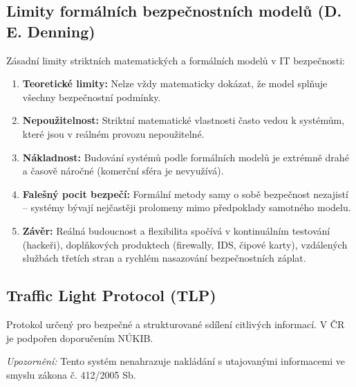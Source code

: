 \documentclass[10pt,a4paper]{article}
\begin{document}
	\subsection{Limity formálních bezpečnostních modelů (D. E. Denning)}
	Zásadní limity striktních matematických a formálních modelů v IT bezpečnosti:
	\begin{enumerate}
		\item \textbf{Teoretické limity:} Nelze vždy matematicky dokázat, že model splňuje všechny bezpečnostní podmínky.
		\item \textbf{Nepoužitelnost:} Striktní matematické vlastnosti často vedou k systémům, které jsou v reálném provozu nepoužitelné.
		\item \textbf{Nákladnost:} Budování systémů podle formálních modelů je extrémně drahé a časově náročné (komerční sféra je nevyužívá).
		\item \textbf{Falešný pocit bezpečí:} Formální metody samy o sobě bezpečnost nezajistí – systémy bývají nejčastěji prolomeny mimo předpoklady samotného modelu.
		\item \textbf{Závěr:} Reálná budoucnost a flexibilita spočívá v kontinuálním testování (hackeři), doplňkových produktech (firewally, IDS, čipové karty), vzdálených službách třetích stran a rychlém nasazování bezpečnostních záplat.
	\end{enumerate}
	
	\subsection{Traffic Light Protocol (TLP)}
	Protokol určený pro bezpečné a strukturované sdílení citlivých informací. V ČR je podpořen doporučením NÚKIB. 
	
	\textit{Upozornění:} Tento systém nenahrazuje nakládání s utajovanými informacemi ve smyslu zákona č. 412/2005 Sb.
	
\end{document}
